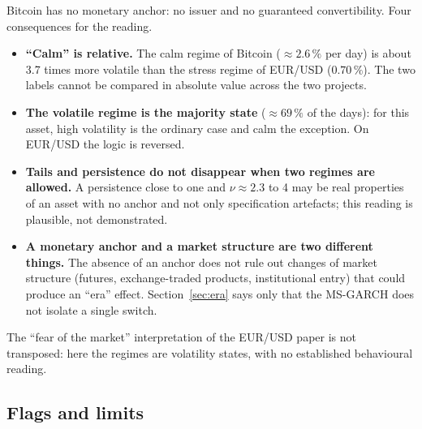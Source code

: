 \documentclass[12pt,a4paper]{article}
\begin{document}
\begin{econbox}
	Bitcoin has no monetary anchor: no issuer and no guaranteed convertibility. Four consequences for the reading.
	\begin{itemize}
		\item \textbf{``Calm'' is relative.} The calm regime of Bitcoin ($\approx 2.6\,\%$ per day) is about 3.7 times more volatile than the stress regime of EUR/USD ($0.70\,\%$). The two labels cannot be compared in absolute value across the two projects.
		\item \textbf{The volatile regime is the majority state} ($\approx 69\,\%$ of the days): for this asset, high volatility is the ordinary case and calm the exception. On EUR/USD the logic is reversed.
		\item \textbf{Tails and persistence do not disappear when two regimes are allowed.} A persistence close to one and $\nu\approx 2.3$ to 4 may be real properties of an asset with no anchor and not only specification artefacts; this reading is plausible, not demonstrated.
		\item \textbf{A monetary anchor and a market structure are two different things.} The absence of an anchor does not rule out changes of market structure (futures, exchange-traded products, institutional entry) that could produce an ``era'' effect. Section~\ref{sec:era} says only that the MS-GARCH does not isolate a single switch.
	\end{itemize}
	The ``fear of the market'' interpretation of the EUR/USD paper is not transposed: here the regimes are volatility states, with no established behavioural reading.
\end{econbox}

\subsection{Flags and limits}
\end{document}
